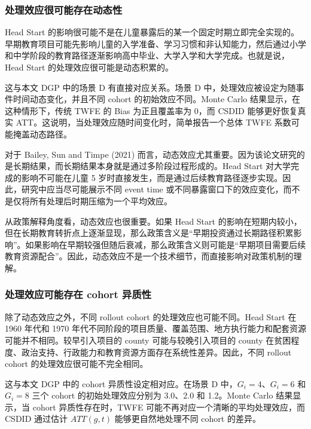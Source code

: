 \documentclass[
  fontset=windows]{ctexart}
\begin{document}
\subsubsection{处理效应很可能存在动态性}\label{ux5904ux7406ux6548ux5e94ux5f88ux53efux80fdux5b58ux5728ux52a8ux6001ux6027}

Head Start
的影响很可能不是在儿童暴露后的某一个固定时期立即完全实现的。早期教育项目可能先影响儿童的入学准备、学习习惯和非认知能力，然后通过小学和中学阶段的教育路径逐渐影响高中毕业、大学入学和大学完成。也就是说，Head
Start 的处理效应很可能是动态积累的。

这与本文 DGP 中的场景 D 有直接对应关系。场景 D
中，处理效应被设定为随事件时间动态变化，并且不同 cohort
的初始效应不同。Monte Carlo 结果显示，在这种情形下，传统 TWFE 的 Bias
为正且覆盖率为 0，而 CSDID 能够更好恢复真实
ATT。这说明，当处理效应随时间变化时，简单报告一个总体 TWFE
系数可能掩盖动态路径。

对于 Bailey, Sun and Timpe (2021)
而言，动态效应尤其重要。因为该论文研究的是长期结果，而长期结果本身就是通过多阶段过程形成的。Head
Start 对大学完成的影响不可能在儿童 5
岁时直接发生，而是通过后续教育路径逐步实现。因此，研究中应当尽可能展示不同
event time
或不同暴露窗口下的效应变化，而不是仅将所有处理后时期压缩为一个平均效应。

从政策解释角度看，动态效应也很重要。如果 Head Start
的影响在短期内较小，但在长期教育转折点上逐渐显现，那么政策含义是``早期投资通过长期路径积累影响''。如果影响在早期较强但随后衰减，那么政策含义则可能是``早期项目需要后续教育资源配合''。因此，动态效应不是一个技术细节，而直接影响对政策机制的理解。

\subsubsection{处理效应可能存在 cohort
异质性}\label{ux5904ux7406ux6548ux5e94ux53efux80fdux5b58ux5728-cohort-ux5f02ux8d28ux6027}

除了动态效应之外，不同 rollout cohort 的处理效应也可能不同。Head Start
在 1960 年代和 1970
年代不同阶段的项目质量、覆盖范围、地方执行能力和配套资源可能并不相同。较早引入项目的
county 可能与较晚引入项目的 county
在贫困程度、政治支持、行政能力和教育资源方面存在系统性差异。因此，不同
rollout cohort 的处理效应很可能不完全相同。

这与本文 DGP 中的 cohort 异质性设定相对应。在场景 D
中，\(G_i=4\)、\(G_i=6\) 和 \(G_i=8\) 三个 cohort 的初始处理效应分别为
3.0、2.0 和 1.2。Monte Carlo 结果显示，当 cohort 异质性存在时，TWFE
可能不再对应一个清晰的平均处理效应，而 CSDID 通过估计 \(ATT(g,t)\)
能够更自然地处理不同 cohort 的差异。
\end{document}
